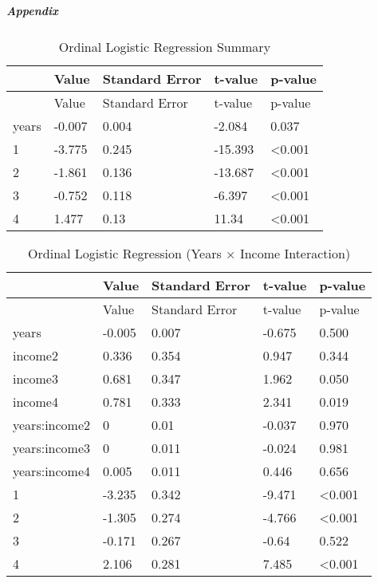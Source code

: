 \documentclass[
  4pt,
]{article}
\begin{document}
\subparagraph{Appendix}\label{appendix}

\begin{longtable}[]{@{}lllll@{}}
\caption{Ordinal Logistic Regression Summary}\tabularnewline
\toprule\noalign{}
& Value & Standard Error & t-value & p-value \\
\midrule\noalign{}
\endfirsthead
\toprule\noalign{}
& Value & Standard Error & t-value & p-value \\
\midrule\noalign{}
\endhead
\bottomrule\noalign{}
\endlastfoot
years & -0.007 & 0.004 & -2.084 & 0.037 \\
1\textbar2 & -3.775 & 0.245 & -15.393 & \textless0.001 \\
2\textbar3 & -1.861 & 0.136 & -13.687 & \textless0.001 \\
3\textbar4 & -0.752 & 0.118 & -6.397 & \textless0.001 \\
4\textbar5 & 1.477 & 0.13 & 11.34 & \textless0.001 \\
\end{longtable}

\begin{longtable}[]{@{}lllll@{}}
\caption{Ordinal Logistic Regression (Years × Income
Interaction)}\tabularnewline
\toprule\noalign{}
& Value & Standard Error & t-value & p-value \\
\midrule\noalign{}
\endfirsthead
\toprule\noalign{}
& Value & Standard Error & t-value & p-value \\
\midrule\noalign{}
\endhead
\bottomrule\noalign{}
\endlastfoot
years & -0.005 & 0.007 & -0.675 & 0.500 \\
income2 & 0.336 & 0.354 & 0.947 & 0.344 \\
income3 & 0.681 & 0.347 & 1.962 & 0.050 \\
income4 & 0.781 & 0.333 & 2.341 & 0.019 \\
years:income2 & 0 & 0.01 & -0.037 & 0.970 \\
years:income3 & 0 & 0.011 & -0.024 & 0.981 \\
years:income4 & 0.005 & 0.011 & 0.446 & 0.656 \\
1\textbar2 & -3.235 & 0.342 & -9.471 & \textless0.001 \\
2\textbar3 & -1.305 & 0.274 & -4.766 & \textless0.001 \\
3\textbar4 & -0.171 & 0.267 & -0.64 & 0.522 \\
4\textbar5 & 2.106 & 0.281 & 7.485 & \textless0.001 \\
\end{longtable}
\end{document}
